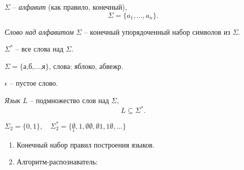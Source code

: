 

\begin{definition}
    $ \Sigma $ -- \emph{алфавит} (как правило, конечный),
    \[
        \Sigma = \{a_1,\ldots,a_n\}.
    \]

    \emph{Слово над алфавитом} $ \Sigma $ -- конечный упорядоченный набор символов из $ \Sigma $.

    $ \Sigma^* $ -- все слова над $ \Sigma $.
\end{definition}

\begin{example}
    $ \Sigma = \{\text{а,б,}\ldots \text{,я}\} $, слова: яблоко, абвежр.

    $ \epsilon $ -- пустое слово.
\end{example}

\begin{definition}[Язык]
    \emph{Язык} $ L $ -- подмножество слов над $ \Sigma $,
    \[
        L \subseteq \Sigma^*.
    \]
\end{definition}

\begin{example}
    $ \Sigma_2 = \{0,1\}, \quad \Sigma_2^* = \{\underset{\epsilon}{\emptyset},1,\emptyset\emptyset,\emptyset1,1\emptyset,\ldots\} $
\end{example}

\begin{remark}\leavevmode
    \begin{enumerate}
        \item Конечный набор правил построения языков.
        \item Алгоритм-распознаватель:
              \begin{figure}[H]
                  \centering
                  \label{fig:fig_01}
              \end{figure}
    \end{enumerate}
\end{remark}

